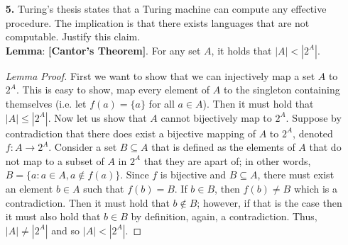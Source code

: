 \documentclass[ 12pt ]{article}
\begin{document}
\begin{enumerate}
		\begin{proof}[Solution]
			A Universal Turing machine is essentially a reprogrammable Turing machine. Moreover, a Universal Turing machine $M_u$ is a three tape Turing machine such that, given a
			description of a Turing machine $M$ and an input string $w$, $M_u$ can perform the computation of $M$ on $w$. The three tapes of $M_u$ are designed to act as the
			description, internal state, and tape contents of $M$. For these to tapes to hold this information, we must have an encoding of $\delta_M$, the current internal state
			of $M$, as well as any input string $w$. We can make use of an encoding using 1s and 0s for every state in $Q_M$ and every character in $\Gamma_M$ and place each of the
			binary expressions on their respective tape. Then $M_u$ can read all three tapes, reading the description and internal state to determine the next action given the current
			character from the input string.
		\end{proof}


	\item[\textbf{5.}] Turing's thesis states that a Turing machine can compute any effective procedure. The implication is that there exists languages that are not computable. Justify
		this claim. \\

		\textbf{Lemma}: \textbf{[Cantor's Theorem]}. For any set $A$, it holds that $|A| < |2^A|$.

		\begin{proof}[Lemma Proof]
			First we want to show that we can injectively map a set $A$ to $2^A$. This is easy to show, map every element of $A$ to the singleton containing themselves (i.e. let $f(a) =
			\{ a \}$ for all $a \in A$). Then it must hold that $|A| \leq |2^A|$. Now let us show that $A$ cannot bijectively map to $2^A$. Suppose by contradiction that there does
			exist a bijective mapping of $A$ to $2^A$, denoted $f : A \to 2^A$. Consider a set $B \subseteq A$ that is defined as the elements of $A$ that do not map to a subset of $A$
			in $2^A$ that they are apart of; in other words, $B = \{ a : a \in A, a \notin f(a) \}$. Since $f$ is bijective and $B \subseteq A$, there must exist an element $b \in A$
			such that $f(b) = B$. If $b \in B$, then $f(b) \neq B$ which is a contradiction. Then it must hold that $b \notin B$; however, if that is the case then it must also hold
			that $b \in B$ by definition, again, a contradiction. Thus, $|A| \neq |2^A|$ and so $|A| < |2^A|$.
		\end{proof}


\end{enumerate}
\end{document}
